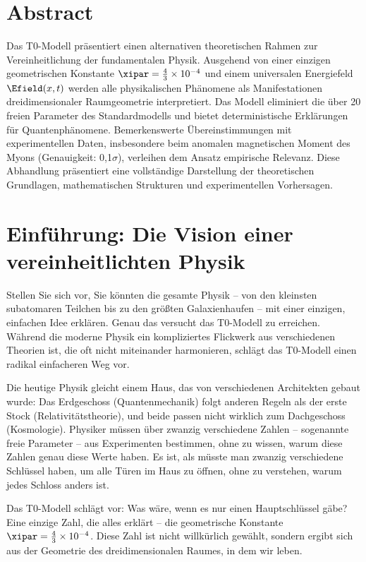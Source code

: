 


	
\section*{Abstract}
		\noindent Das T0-Modell präsentiert einen alternativen theoretischen Rahmen zur Vereinheitlichung der fundamentalen Physik. Ausgehend von einer einzigen geometrischen Konstante $\xipar = \frac{4}{3} \times 10^{-4}$ und einem universalen Energiefeld $\Efield(x,t)$ werden alle physikalischen Phänomene als Manifestationen dreidimensionaler Raumgeometrie interpretiert. Das Modell eliminiert die über 20 freien Parameter des Standardmodells und bietet deterministische Erklärungen für Quantenphänomene. Bemerkenswerte Übereinstimmungen mit experimentellen Daten, insbesondere beim anomalen magnetischen Moment des Myons (Genauigkeit: 0,1$\sigma$), verleihen dem Ansatz empirische Relevanz. Diese Abhandlung präsentiert eine vollständige Darstellung der theoretischen Grundlagen, mathematischen Strukturen und experimentellen Vorhersagen.

	
	
	\section{Einführung: Die Vision einer vereinheitlichten Physik}
	
	Stellen Sie sich vor, Sie könnten die gesamte Physik -- von den kleinsten subatomaren Teilchen bis zu den größten Galaxienhaufen -- mit einer einzigen, einfachen Idee erklären. Genau das versucht das T0-Modell zu erreichen. Während die moderne Physik ein kompliziertes Flickwerk aus verschiedenen Theorien ist, die oft nicht miteinander harmonieren, schlägt das T0-Modell einen radikal einfacheren Weg vor.
	
	Die heutige Physik gleicht einem Haus, das von verschiedenen Architekten gebaut wurde: Das Erdgeschoss (Quantenmechanik) folgt anderen Regeln als der erste Stock (Relativitätstheorie), und beide passen nicht wirklich zum Dachgeschoss (Kosmologie). Physiker müssen über zwanzig verschiedene Zahlen -- sogenannte freie Parameter -- aus Experimenten bestimmen, ohne zu wissen, warum diese Zahlen genau diese Werte haben. Es ist, als müsste man zwanzig verschiedene Schlüssel haben, um alle Türen im Haus zu öffnen, ohne zu verstehen, warum jedes Schloss anders ist.
	
	\begin{revolutionary}
		Das T0-Modell schlägt vor: Was wäre, wenn es nur einen Hauptschlüssel gäbe? Eine einzige Zahl, die alles erklärt -- die geometrische Konstante $\xipar = \frac{4}{3} \times 10^{-4}$. Diese Zahl ist nicht willkürlich gewählt, sondern ergibt sich aus der Geometrie des dreidimensionalen Raumes, in dem wir leben.
	\end{revolutionary}
	
